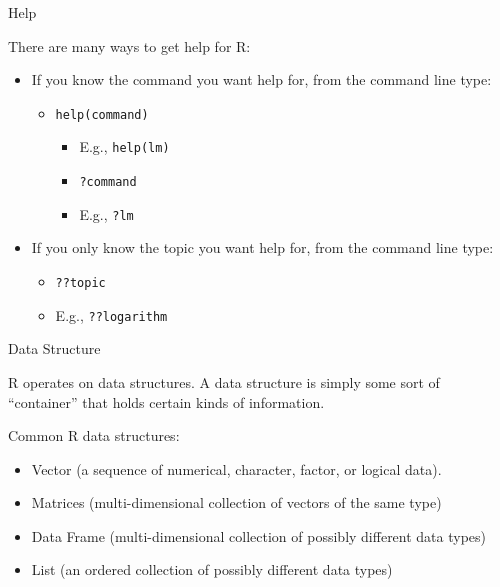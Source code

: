 \begin{frame}[fragile]{Help}
\protect\hypertarget{help}{}

There are many ways to get help for R:

\begin{itemize}
\tightlist
\item
  If you know the command you want help for, from the command line type:

  \begin{itemize}
  \tightlist
  \item
    \texttt{help(command)}

    \begin{itemize}
    \tightlist
    \item
      E.g., \texttt{help(lm)}
    \item
      \texttt{?command}
    \item
      E.g., \texttt{?lm}
    \end{itemize}
  \end{itemize}
\item
  If you only know the topic you want help for, from the command line
  type:

  \begin{itemize}
  \tightlist
  \item
    \texttt{??topic}
  \item
    E.g., \texttt{??logarithm}
  \end{itemize}
\end{itemize}

\end{frame}

\begin{frame}{Data Structure}
\protect\hypertarget{data-structure}{}

R operates on data structures. A data structure is simply some sort of
``container'' that holds certain kinds of information.

Common R data structures:

\begin{itemize}
\tightlist
\item
  Vector (a sequence of numerical, character, factor, or logical data).
\item
  Matrices (multi-dimensional collection of vectors of the same type)
\item
  Data Frame (multi-dimensional collection of possibly different data
  types)
\item
  List (an ordered collection of possibly different data types)
\end{itemize}

\end{frame}


